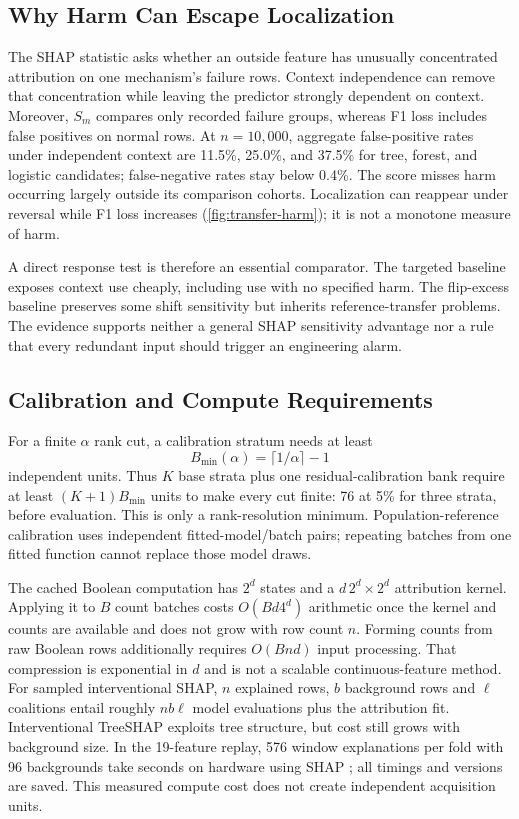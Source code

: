 \documentclass[conference]{IEEEtran}
\begin{document}
\subsection{Why Harm Can Escape Localization}
The SHAP statistic asks whether an outside feature has unusually concentrated attribution on one mechanism's failure rows. Context independence can remove that concentration while leaving the predictor strongly dependent on context. Moreover, $S_m$ compares only recorded failure groups, whereas F1 loss includes false positives on normal rows. At $n=10{,}000$, aggregate false-positive rates under independent context are 11.5\%, 25.0\%, and 37.5\% for tree, forest, and logistic candidates; false-negative rates stay below 0.4\%. The score misses harm occurring largely outside its comparison cohorts. Localization can reappear under reversal while F1 loss increases (\cref{fig:transfer-harm}); it is not a monotone measure of harm.

A direct response test is therefore an essential comparator. The targeted baseline exposes context use cheaply, including use with no specified harm. The flip-excess baseline preserves some shift sensitivity but inherits reference-transfer problems. The evidence supports neither a general SHAP sensitivity advantage nor a rule that every redundant input should trigger an engineering alarm.

\subsection{Calibration and Compute Requirements}
For a finite $\alpha$ rank cut, a calibration stratum needs at least
\begin{equation}
 B_{\min}(\alpha)=\lceil1/\alpha\rceil-1
\end{equation}
independent units. Thus $K$ base strata plus one residual-calibration bank require at least $(K+1)B_{\min}$ units to make every cut finite: 76 at 5\% for three strata, before evaluation. This is only a rank-resolution minimum. Population-reference calibration uses independent fitted-model/batch pairs; repeating batches from one fitted function cannot replace those model draws.

The cached Boolean computation has $2^d$ states and a $d\,2^d\times2^d$ attribution kernel. Applying it to $B$ count batches costs $O(Bd4^d)$ arithmetic once the kernel and counts are available and does not grow with row count $n$. Forming counts from raw Boolean rows additionally requires $O(Bnd)$ input processing. That compression is exponential in $d$ and is not a scalable continuous-feature method. For sampled interventional SHAP, $n$ explained rows, $b$ background rows and $\ell$ coalitions entail roughly $n b\ell$ model evaluations plus the attribution fit. Interventional TreeSHAP exploits tree structure, but cost still grows with background size. In the 19-feature replay, 576 window explanations per fold with 96 backgrounds take \cwruShapRuntime{} seconds on \cwruHardware{} hardware using SHAP \cwruShapVersion{}; all timings and versions are saved. This measured compute cost does not create independent acquisition units.
\end{document}
